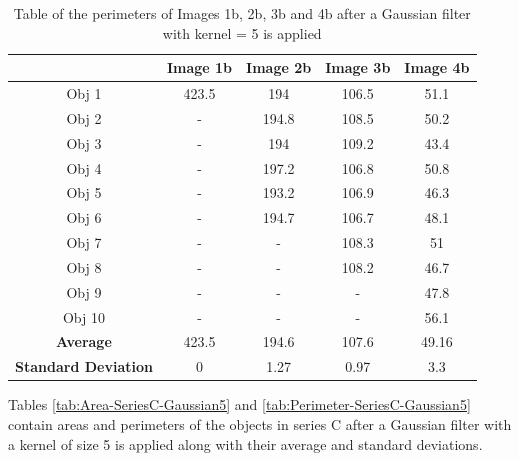 \documentclass[runningheads]{llncs}
\begin{document}
\begin{table}[h!]
\centering
\begin{tabular}{|c|c|c|c|c|}
\hline
\textbf{} & \textbf{Image 1b} & \textbf{Image 2b} & \textbf{Image 3b} & \textbf{Image 4b} \\
\hline
Obj 1 & 423.5      & 194  & 106.5 &  51.1 \\ \hline
Obj 2 &  -          & 194.8  & 108.5 & 50.2\\ \hline
Obj 3 &   -         & 194 & 109.2 &  43.4\\ \hline
Obj 4 &   -         & 197.2  & 106.8 &  50.8\\ \hline
Obj 5 &   -         & 193.2 & 106.9 &  46.3\\ \hline
Obj 6 &   -         & 194.7 & 106.7 &  48.1\\ \hline
Obj 7 &   -         &  -     & 108.3 &  51\\ \hline
Obj 8 &   -         &  -     & 108.2 &  46.7 \\ \hline
Obj 9 &    -        &  -     &  -    & 47.8\\ \hline
Obj 10 &  -          &  -     &  -    & 56.1\\ \hline
\textbf{Average} &   423.5    &  194.6      &   107.6    & 49.16  \\ \hline
\textbf{Standard Deviation} &  0      &  1.27      &    0.97   & 3.3  \\ \hline
\end{tabular}
\caption{Table of the perimeters of Images 1b, 2b, 3b and 4b after a Gaussian filter with kernel = 5 is applied}
\label{tab:Perimeter-SeriesB-Gaussian5}
\end{table}

\newpage
Tables \ref{tab:Area-SeriesC-Gaussian5} and \ref{tab:Perimeter-SeriesC-Gaussian5} contain areas and perimeters of the objects in series C after a Gaussian filter with a kernel of size 5 is applied along with their average and standard deviations.
\end{document}
